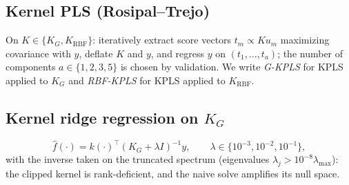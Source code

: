 \documentclass[11pt]{article}
\begin{document}
\subsection{Kernel PLS (Rosipal--Trejo)}
On $K\in\{K_{G},K_{\mathrm{RBF}}\}$: iteratively extract score vectors
$t_{m}\propto Ku_{m}$ maximizing covariance with $y$, deflate $K$ and $y$, and
regress $y$ on $(t_{1},\dots,t_{a})$; the number of components $a\in\{1,2,3,5\}$
is chosen by validation. We write \emph{G-KPLS} for KPLS applied to $K_{G}$ and
\emph{RBF-KPLS} for KPLS applied to $K_{\mathrm{RBF}}$.

\subsection{Kernel ridge regression on $K_{G}$}
\[
\hat{f}(\cdot)=k(\cdot)^{\top}\left(K_{G}+\lambda I\right)^{-1}y,
\qquad \lambda\in\{10^{-3},10^{-2},10^{-1}\},
\]
with the inverse taken on the truncated spectrum (eigenvalues
$\lambda_{j}>10^{-8}\lambda_{\max}$): the clipped kernel is rank-deficient, and
the naive solve amplifies its null space.
\end{document}

